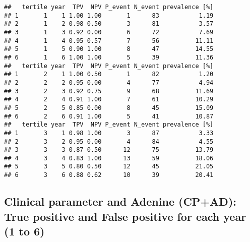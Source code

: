 \documentclass[
]{article}
\begin{document}
\begin{verbatim}
##   tertile year  TPV  NPV P_event N_event prevalence [%]
## 1       1    1 1.00 1.00       1      83           1.19
## 2       1    2 0.98 0.50       3      81           3.57
## 3       1    3 0.92 0.00       6      72           7.69
## 4       1    4 0.95 0.57       7      56          11.11
## 5       1    5 0.90 1.00       8      47          14.55
## 6       1    6 1.00 1.00       5      39          11.36
##   tertile year  TPV  NPV P_event N_event prevalence [%]
## 1       2    1 1.00 0.50       1      82           1.20
## 2       2    2 0.95 0.00       4      77           4.94
## 3       2    3 0.92 0.75       9      68          11.69
## 4       2    4 0.91 1.00       7      61          10.29
## 5       2    5 0.85 0.00       8      45          15.09
## 6       2    6 0.91 1.00       5      41          10.87
##   tertile year  TPV  NPV P_event N_event prevalence [%]
## 1       3    1 0.98 1.00       3      87           3.33
## 2       3    2 0.95 0.00       4      84           4.55
## 3       3    3 0.87 0.50      12      75          13.79
## 4       3    4 0.83 1.00      13      59          18.06
## 5       3    5 0.80 0.50      12      45          21.05
## 6       3    6 0.88 0.62      10      39          20.41
\end{verbatim}

\hypertarget{clinical-parameter-and-adenine-cpad-true-positive-and-false-positive-for-each-year-1-to-6-1}{%
\subsection{Clinical parameter and Adenine (CP+AD): True positive and
False positive for each year (1 to
6)}\label{clinical-parameter-and-adenine-cpad-true-positive-and-false-positive-for-each-year-1-to-6-1}}
\end{document}
